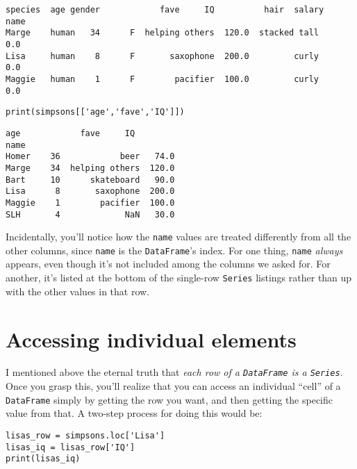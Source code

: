 \begin{Verbatim}[fontsize=\scriptsize,samepage=true,frame=leftline,framesep=5mm,framerule=1mm]
       species  age gender            fave     IQ          hair  salary
name                                                                   
Marge    human   34      F  helping others  120.0  stacked tall     0.0
Lisa     human    8      F       saxophone  200.0         curly     0.0
Maggie   human    1      F        pacifier  100.0         curly     0.0
\end{Verbatim}

\medskip
\begin{Verbatim}[fontsize=\scriptsize,samepage=true,frame=single,framesep=3mm]
print(simpsons[['age','fave','IQ']])
\end{Verbatim}
\vspace{-.2in}

\begin{Verbatim}[fontsize=\scriptsize,samepage=true,frame=leftline,framesep=5mm,framerule=1mm]
        age            fave     IQ
name                              
Homer    36            beer   74.0
Marge    34  helping others  120.0
Bart     10      skateboard   90.0
Lisa      8       saxophone  200.0
Maggie    1        pacifier  100.0
SLH       4             NaN   30.0
\end{Verbatim}

Incidentally, you'll notice how the \texttt{name} values are treated
differently from all the other columns, since \texttt{name} is the
\texttt{DataFrame}'s index. For one thing, \texttt{name} \textit{always}
appears, even though it's not included among the columns we asked for. For
another, it's listed at the bottom of the single-row \texttt{Series} listings
rather than up with the other values in that row.

\section{Accessing individual elements}

I mentioned above the eternal truth that \textit{each row of a
\texttt{DataFrame} is a \texttt{Series}}. Once you grasp this, you'll realize
that you can access an individual ``cell'' of a \texttt{DataFrame} simply by
getting the row you want, and then getting the specific value from that. A
two-step process for doing this would be:

\begin{Verbatim}[fontsize=\small,samepage=true,frame=single,framesep=3mm]
lisas_row = simpsons.loc['Lisa']
lisas_iq = lisas_row['IQ']
print(lisas_iq)
\end{Verbatim}
\vspace{-.2in}

